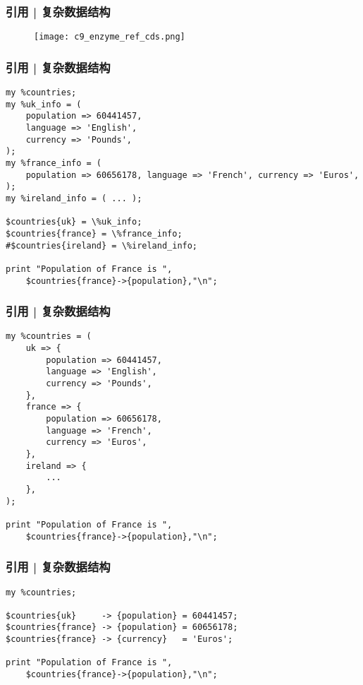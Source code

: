 \begin{frame}
  \frametitle{引用 | 复杂数据结构}
  \begin{figure}
    \centering
    \texttt{[image: c9\_enzyme\_ref\_cds.png]}
  \end{figure}
\end{frame}

\begin{frame}[fragile]
  \frametitle{引用 | 复杂数据结构}
  \vspace{-0.6em}
\begin{lstlisting}[basicstyle=\small\tt]
my %countries;
my %uk_info = (
    population => 60441457,
    language => 'English',
    currency => 'Pounds',
);
my %france_info = (
    population => 60656178, language => 'French', currency => 'Euros',
);
my %ireland_info = ( ... );

$countries{uk} = \%uk_info;
$countries{france} = \%france_info;
#$countries{ireland} = \%ireland_info;

print "Population of France is ",
    $countries{france}->{population},"\n";
\end{lstlisting}
\end{frame}

\begin{frame}[fragile]
  \frametitle{引用 | 复杂数据结构}
  \vspace{-0.6em}
\begin{lstlisting}[basicstyle=\small\tt]
my %countries = (
    uk => {
        population => 60441457,
        language => 'English',
        currency => 'Pounds',
    },
    france => {
        population => 60656178,
        language => 'French',
        currency => 'Euros',
    },
    ireland => {
        ...
    },
);

print "Population of France is ",
    $countries{france}->{population},"\n";
\end{lstlisting}
\end{frame}

\begin{frame}[fragile]
  \frametitle{引用 | 复杂数据结构}
\begin{lstlisting}[basicstyle=\small\tt]
my %countries;

$countries{uk}     -> {population} = 60441457;
$countries{france} -> {population} = 60656178;
$countries{france} -> {currency}   = 'Euros';

print "Population of France is ",
    $countries{france}->{population},"\n";
\end{lstlisting}
\end{frame}

